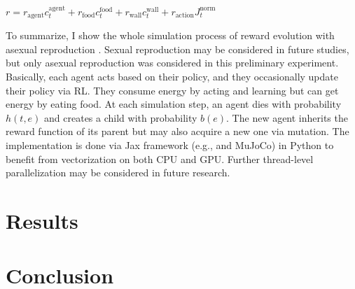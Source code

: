 $r = r_{\textrm{agent}}c_{t}^{\textrm{agent}} + r_{\textrm{food}}c_{t}^{\textrm{food}} + r_{\textrm{wall}}c_{t}^{\textrm{wall}} + r_{\textrm{action}}J_{t}^{\textrm{norm}}$


To summarize, I show the whole simulation process of reward evolution with asexual reproduction . Sexual reproduction may be considered in future studies, but only asexual reproduction was considered in this preliminary experiment. Basically, each agent acts based on their policy, and they occasionally update their policy via RL. They consume energy by acting and learning but can get energy by eating food. At each simulation step, an agent dies with probability $h(t, e)$ and creates a child with probability $b(e)$. The new agent inherits the reward function of its parent but may also acquire a new one via mutation. The implementation is done via Jax framework (e.g., \citet{jax2018github} and MuJoCo) in Python to benefit from vectorization on both CPU and GPU. Further thread-level parallelization may be considered in future research.

\section{Results}

\section{Conclusion}